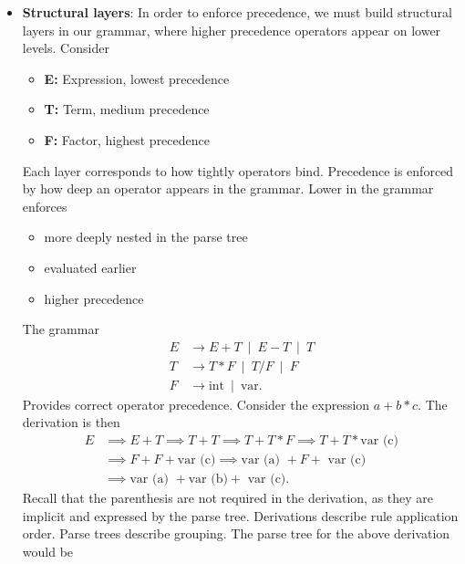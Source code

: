 \documentclass{report}
\begin{document}
\begin{itemize}
        \item \textbf{Structural layers}: In order to enforce precedence, we must build structural layers in our grammar, where higher precedence operators appear on lower levels. Consider
            \begin{itemize}
                \item \textbf{E:} Expression, lowest precedence
                \item \textbf{T:} Term, medium precedence
                \item \textbf{F:} Factor, highest precedence
            \end{itemize} 
            Each layer corresponds to how tightly operators bind. Precedence is enforced by how deep an operator appears in the grammar. Lower in the grammar enforces 
            \begin{itemize}
                \item more deeply nested in the parse tree
                \item evaluated earlier
                \item higher precedence
            \end{itemize}
            The grammar
            \begin{align*}
                E &\to E + T \ \mid \ E - T \ \mid \ T \\
                T &\to T * F \ \mid \ T / F \ \mid \ F \\
                F &\to \text{int} \ \mid \ \text{var}
            .\end{align*}
            Provides correct operator precedence. Consider the expression $a + b * c$. The derivation is then
            \begin{align*}
                E &\implies E + T \implies T + T \implies T + T * F \implies T + T * \text{var (c)} \\
                  &\implies F + F + \text{var (c)} \implies \text{var (a) } + F + \text{ var (c)}  \\
                  &\implies \text{var (a) } + \text{var (b)} + \text{ var (c)}
            .\end{align*}
            Recall that the parenthesis are not required in the derivation, as they are implicit and expressed by the parse tree. Derivations describe rule application order. Parse trees describe grouping.
            \bigbreak \noindent 
            The parse tree for the above derivation would be
            \bigbreak \noindent 

\end{itemize}
\end{document}
